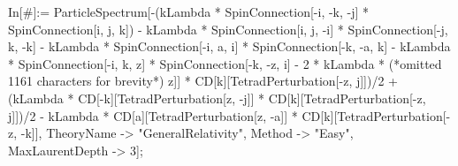 In[\#]:= ParticleSpectrum[-(kLambda * SpinConnection[-i, -k, -j] * SpinConnection[i, j, k]) - kLambda * SpinConnection[i, j, -i] * SpinConnection[-j, k, -k] - kLambda * SpinConnection[-i, a, i] * SpinConnection[-k, -a, k] - kLambda * SpinConnection[-i, k, z] * SpinConnection[-k, -z, i] - 2 * kLambda * (*omitted 1161 characters for brevity*) z]] * CD[k][TetradPerturbation[-z, j]])/2 + (kLambda * CD[-k][TetradPerturbation[z, -j]] * CD[k][TetradPerturbation[-z, j]])/2 - kLambda * CD[a][TetradPerturbation[z, -a]] * CD[k][TetradPerturbation[-z, -k]], TheoryName -> "GeneralRelativity", Method -> "Easy", MaxLaurentDepth -> 3];